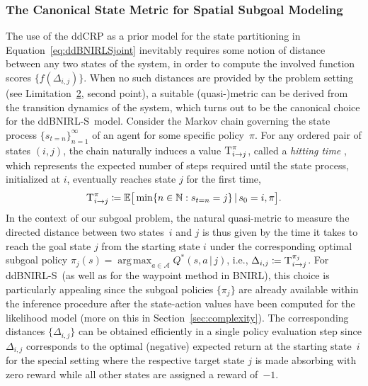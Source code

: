 \documentclass[twoside,11pt]{article}
\newcommand{\given}{\,\vert\,}
\newcommand{\E}{\mathbb{E}}
\newcommand{\hitting}{\text{\textsc{T}}}
\DeclareMathOperator*{\argmax}{arg\,max}
\newcommand{\defeq}{\coloneqq}
\newcommand{\eqpunkt}{.}
\newcommand{\ie}{i.e.}
\newcommand{\ddBNIRLS}{\mbox{ddBNIRL-S}}
\begin{document}
\subsubsection{The Canonical State Metric for Spatial Subgoal Modeling}
\label{sec:canonicalStateMetric}
%
The use of the ddCRP as a prior model for the state partitioning in Equation~\eqref{eq:ddBNIRLSjoint} %
%
inevitably requires %
some notion of distance %
between any two states of the system, in order to compute the involved function scores $\{f(\Delta_{i,j})\}$. When no such distances %
are provided by the problem setting (see Limitation~\hyperref[phantom:lim2]{2}, second point), a suitable \mbox{(quasi-)metric} can be derived from the transition dynamics of the system, which turns out to be %
the canonical choice %
for the \ddBNIRLS\ model.
%
%
%
Consider the Markov chain governing the state %
process $\{s_{t=n}\}_{n=1}^\infty$ of an agent for some specific policy~$\pi$. For any ordered pair of states $(i,j)$, the chain naturally induces a value 
$\hitting^\pi_{i\rightarrow j}$, called a \textit{hitting time} \citep{taylor2014introduction,tewari2008optimistic}, which represents the expected number of steps required until the state process, initialized at $i$, eventually reaches state $j$ for the first time,
\begin{equation*}
\hitting^\pi_{i\rightarrow j} \defeq \E \big[ \min \{n\in\mathbb{N} : s_{t=n} = j \} \given s_0 = i, \pi \big] \eqpunkt
\end{equation*}
In the context of our subgoal problem, the natural quasi-metric to measure the directed distance between two states~$i$ and $j$ is thus given by the time it takes to reach the goal state $j$ from the starting state $i$ under the corresponding optimal subgoal policy $\pi_j (s) = \argmax_{a\in\mathcal{A}} Q^*(s,a \given j)$, \ie, $\Delta_{i,j} \defeq \hitting^{\pi_j}_{i\rightarrow j}$.
%
%
%
For \ddBNIRLS\  (as well as for the waypoint method in BNIRL), %
this choice is particularly appealing since the subgoal policies $\{\pi_j\}$ are %
%
already available within the inference procedure after the state-action values have been computed for the likelihood model (more on this in Section~\ref{sec:complexity}). The corresponding distances $\{\Delta_{i,j}\}$ can be obtained efficiently in a single policy evaluation step since $\Delta_{i,j}$ corresponds to the optimal (negative) expected return at the starting state~$i$ %
for the special setting where 
%
the respective target state $j$ is made absorbing with zero reward while all other states are assigned a reward of~$-1$.
\end{document}
